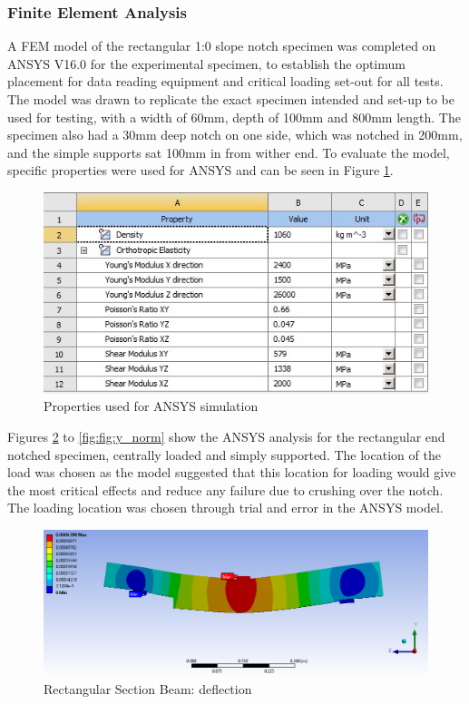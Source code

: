 \documentclass[11pt,a4paper]{article}
\numberwithin{equation}{subsection}
\begin{document}
\subsubsection{Finite Element Analysis}
A FEM model of the rectangular 1:0 slope notch specimen was completed on ANSYS V16.0 for the experimental specimen, to establish the optimum placement for data reading equipment and critical loading set-out for all tests. The model was drawn to replicate the exact specimen intended and set-up to be used for testing, with a width of 60mm, depth of 100mm and 800mm length. The specimen also had a 30mm deep notch on one side, which was notched in 200mm, and the simple supports sat 100mm in from wither end. To evaluate the model, specific properties were used for ANSYS and can be seen in Figure \ref{fig:Properties}.
\begin{figure}[h]
	\begin{center}
		\includegraphics[scale=0.65]{Ansys_Properties}
	\end{center}
	\caption{Properties used for ANSYS simulation}
	\label{fig:Properties}
\end{figure}
\pagebreak

\noindent
Figures \ref{fig:Def} to \ref{fig:fig:y_norm} show the ANSYS analysis for the rectangular end notched specimen, centrally loaded and simply supported. The location of the load was chosen as the model suggested that this location for loading would give the most critical effects and reduce any failure due to crushing over the notch. The loading location was chosen through trial and error in the ANSYS model.
\vspace*{\baselineskip}

\begin{figure}[h]
	\begin{center}
		\includegraphics[scale=0.45]{Ansys_Deflection}
	\end{center}
	
	\caption{Rectangular Section Beam: deflection}
	\label{fig:Def}
\end{figure}
\end{document}
